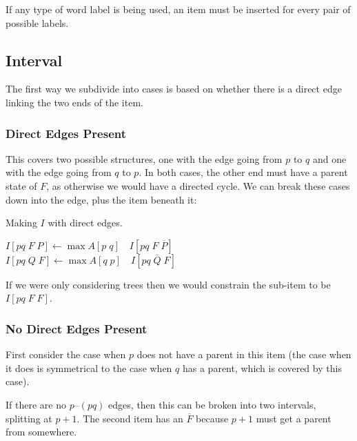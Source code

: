 
If any type of word label is being used, an item must be inserted for every pair of possible labels.

\subsection{Interval}
The first way we subdivide into cases is based on whether there is a direct edge linking the two ends of the item.

\subsubsection{Direct Edges Present}

\begin{center}
\end{center}

This covers two possible structures, one with the edge going from $p$ to $q$ and one with the edge going from $q$ to $p$.
In both cases, the other end must have a parent state of $F$, as otherwise we would have a directed cycle.
We can break these cases down into the edge, plus the item beneath it:

\begin{finalEquation}
\caption{Making $I$ with direct edges.}
  $I[pq \; F \; P] \leftarrow \max A[p \; q] \quad I[pq \; F \; \overline{P}]$ \\
  $I[pq \; Q \; F] \leftarrow \max A[q \; p] \quad I[pq \; \overline{Q} \; F]$
\end{finalEquation}

If we were only considering trees then we would constrain the sub-item to be $I[pq \; F \; F]$.

\subsubsection{No Direct Edges Present}

First consider the case when $p$ does not have a parent in this item (the case when it does is symmetrical to the case when $q$ has a parent, which is covered by this case).

If there are no $p$--$(pq)$ edges, then this can be broken into two intervals, splitting at $p+1$.
The second item has an $\overline{F}$ because $p+1$ must get a parent from somewhere.

